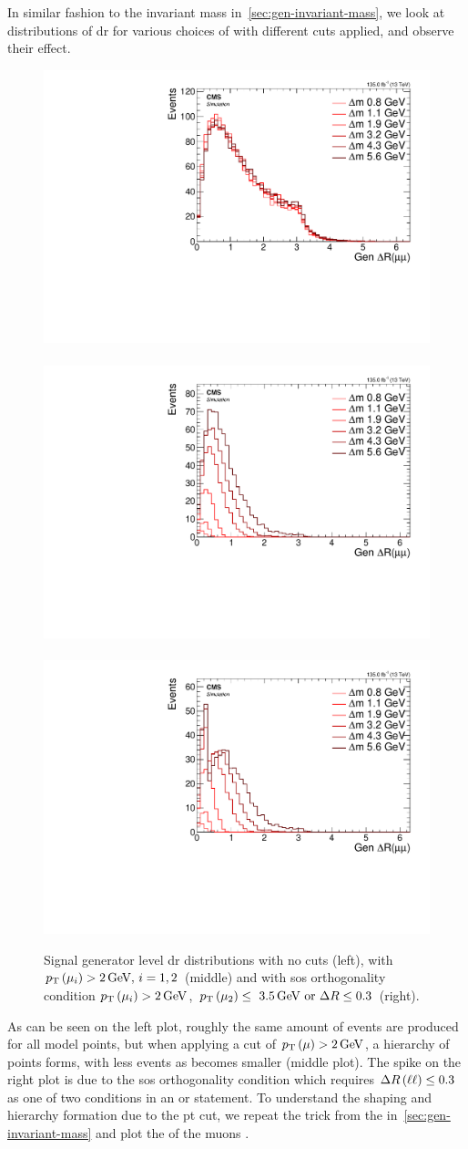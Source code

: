 In similar fashion to the invariant mass in~\ref{sec:gen-invariant-mass}, we look at distributions of \gls{dr} for various choices of \dm with different cuts applied, and observe their effect.

\begin{figure}[!htb]
\centering
\includegraphics[width=0.32\linewidth]{plots/signal_muons_gen/none_gen_deltaR.pdf} \,
\includegraphics[width=0.32\linewidth]{plots/signal_muons_gen/none_gen_deltaR_cut.pdf}  \,
\includegraphics[width=0.32\linewidth]{plots/signal_muons_gen/none_gen_deltaR_orth.pdf} \\
\caption[Signal generator level \DR distributions]{ Signal generator level \gls{dr} distributions with no cuts (left), with $p_{\mathrm{T}}\left(\mu_i\right)>2\,\text{Ge\hspace{-.08em}V},\,i=1,2$ (middle) and with \gls{sos} orthogonality condition $p_{\mathrm{T}}\left(\mu_i\right)>2\,\text{Ge\hspace{-.08em}V}$, $p_{\mathrm{T}}\left(\mu_2\right)\leq~3.5\,\text{Ge\hspace{-.08em}V}\text{ or }\Delta R\leq 0.3$ (right).}
\label{fig:signal-generator-dr}
\end{figure}

As can be seen on the left plot, roughly the same amount of events are produced for all \dm model points, but when applying a cut of $p_{\mathrm{T}}\left(\mu\right)>2\,\text{Ge\hspace{-.08em}V}$, a hierarchy of \dm points forms, with less events as \dm becomes smaller (middle plot). The spike on the right plot is due to the \gls{sos} orthogonality condition which requires $\Delta R\left(\ell\ell\right)\leq 0.3$ as one of two conditions in an or statement.
To understand the shaping and hierarchy formation due to the \gls{pt} cut, we repeat the trick from the \mmumu in~\ref{sec:gen-invariant-mass} and plot the \pt of the muons \vs \drll.

